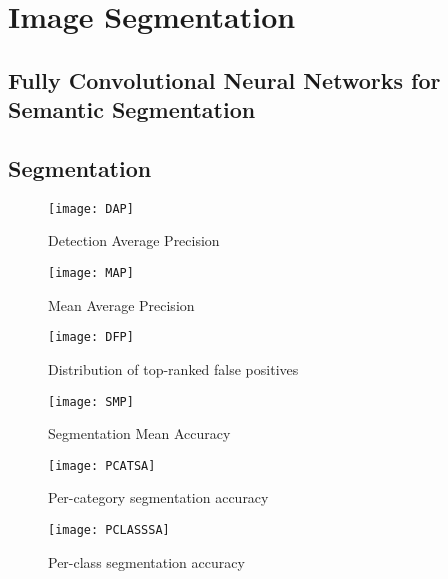 \section{Image Segmentation}
\subsection*{Fully Convolutional Neural Networks for Semantic Segmentation}

\subsection*{Segmentation}


\begin{figure}
    \texttt{[image: DAP]}
    \caption{Detection Average Precision \textcite{donahue}}
    \label{fig:dap}
\end{figure}

\begin{figure}
    \texttt{[image: MAP]}
    \caption{Mean Average Precision \textcite{donahue}}
    \label{fig:MAP}
\end{figure}

\begin{figure}
    \texttt{[image: DFP]}
    \caption{Distribution of top-ranked false positives
    \textcite{donahue}}
    \label{fig:DFP}
\end{figure}

\begin{figure}
    \texttt{[image: SMP]}
    \caption{Segmentation Mean Accuracy \textcite{donahue}}
    \label{fig:SMP}
\end{figure}

\begin{figure}
    \texttt{[image: PCATSA]}
    \caption{Per-category segmentation accuracy \textcite{donahue}}
    \label{fig:PCATSA}
\end{figure}

\begin{figure}
    \texttt{[image: PCLASSSA]}
    \caption{Per-class segmentation accuracy \textcite{donahue}}
    \label{fig:PCLASSA}
\end{figure}

